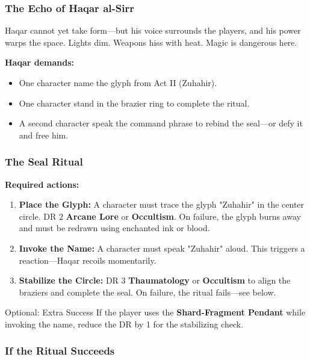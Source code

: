 \subsubsection*{The Echo of Haqar al-Sirr}

Haqar cannot yet take form—but his voice surrounds the players, and his power warps the space. Lights dim. Weapons hiss with heat. Magic is dangerous here.

\textbf{Haqar demands:}  
\begin{itemize}
    \item One character name the glyph from Act II (Zuhahir).
    \item One character stand in the brazier ring to complete the ritual.
    \item A second character speak the command phrase to rebind the seal—or defy it and free him.
\end{itemize}

\subsubsection*{The Seal Ritual}

\textbf{Required actions:}

\begin{enumerate}
    \item \textbf{Place the Glyph:} A character must trace the glyph "Zuhahir" in the center circle. DR 2 \textbf{Arcane Lore} or \textbf{Occultism}. On failure, the glyph burns away and must be redrawn using enchanted ink or blood.
    
    \item \textbf{Invoke the Name:} A character must speak "Zuhahir" aloud. This triggers a reaction—Haqar recoils momentarily.

    \item \textbf{Stabilize the Circle:} DR 3 \textbf{Thaumatology} or \textbf{Occultism} to align the braziers and complete the seal. On failure, the ritual fails—see below.
\end{enumerate}

\begin{CommentBox}{Optional: Extra Success}
    If the player uses the \textbf{Shard-Fragment Pendant} while invoking the name, reduce the DR by 1 for the stabilizing check.
\end{CommentBox}

\subsubsection*{If the Ritual Succeeds}

